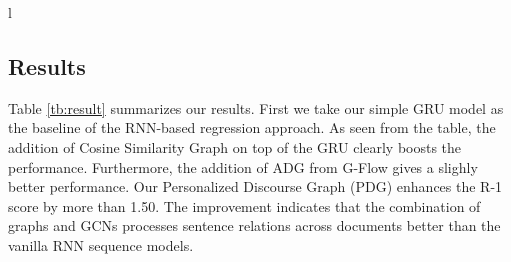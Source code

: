 \documentclass[11pt,a4paper]{article}
\begin{document}
\begin{table}[]
\begin{tabular}{l}
\subsection{Results}
\begin{table}[t]
\centering
\hspace{-1.5mm}
\caption{ROUGE Recalls on DUC 2004. We show mean (and standard deviation for R-1) over 10 repeated trials for each of our experiments.}
\label{tb:result}
\vspace{-5mm}
\end{table}



Table \ref{tb:result} summarizes our results.
First we take our simple GRU model as the baseline of the RNN-based regression approach.
As seen from the table, the addition of Cosine Similarity Graph on top of the GRU clearly boosts the performance.
Furthermore, the addition of ADG from G-Flow gives a slighly better performance.
Our Personalized Discourse Graph (PDG) enhances the R-1 score by more than 1.50.
The improvement indicates that the combination of graphs and GCNs processes sentence relations across documents better than the vanilla RNN sequence models.


\end{tabular}
\end{table}
\end{document}

